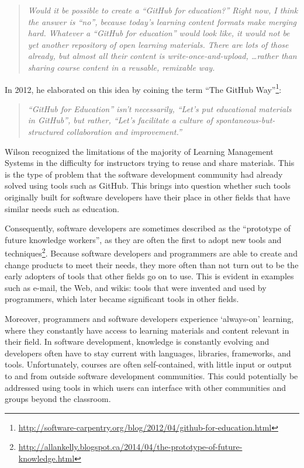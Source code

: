 \begin{quote}\textit{Would it be possible to create a ``GitHub for education?'' Right now, I think the answer is ``no'', because today's learning content formats make merging hard. Whatever a ``GitHub for education'' would look like, it would not be yet another repository of open learning materials. There are lots of those already, but almost all their content is write-once-and-upload, \ldots rather than sharing course content in a reusable, remixable way.}\end{quote}

In 2012, he elaborated on this idea by coining the term ``The GitHub Way''\footnote{\url{http://software-carpentry.org/blog/2012/04/github-for-education.html}}:

\begin{quote}\textit{``GitHub for Education'' isn’t necessarily, ``Let’s put educational materials in GitHub'', but rather, ``Let’s facilitate a culture of spontaneous-but-structured collaboration and improvement.''}\end{quote}

Wilson recognized the limitations of the majority of Learning Management Systems in the difficulty for instructors trying to reuse and share materials. This is the type of problem that the software development community had already solved using tools such as GitHub. This brings into question whether such tools originally built for software developers have their place in other fields that have similar needs such as education.

Consequently, software developers are sometimes described as the ``prototype of future knowledge workers'', as they are often the first to adopt new tools and techniques\footnote{\url{http://allankelly.blogspot.ca/2014/04/the-prototype-of-future-knowledge.html}}. Because software developers and programmers are able to create and change products to meet their needs, they more often than not turn out to be the early adopters of tools that other fields go on to use. This is evident in examples such as e-mail, the Web, and wikis: tools that were invented and used by programmers, which later became significant tools in other fields.


Moreover, programmers and software developers experience `always-on' learning, where they constantly have access to learning materials and content relevant in their field. In software development, knowledge is constantly evolving and developers often have to stay current with languages, libraries, frameworks, and tools. Unfortunately, courses are often self-contained, with little input or output to and from outside software development communities. This could potentially be addressed using tools in which users can interface with other communities and groups beyond the classroom.

